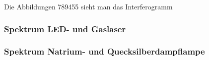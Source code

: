 {			\begin{figure}[htb]
				\centering
				
				\caption{}
				\label{fig:schwebung-1}
			\end{figure}

			\begin{figure}[htb]
				\centering
				
				\caption{}
				\label{fig:schwebung-2}
			\end{figure}

			Die Abbildungen 789455 sieht man das Interferogramm 

		\subsubsection{Spektrum LED- und Gaslaser} %
		\label{ssub:spektrum_led_und_gaslaser}
		
			\begin{figure}[htb]
				\centering
				
				\caption{}
				\label{fig:}
			\end{figure}

			\begin{figure}[htb]
				\centering
				
				\caption{}
				\label{fig:}
			\end{figure}

			\begin{figure}[htb]
				\centering
				
				\caption{}
				\label{fig:}
			\end{figure}


		\subsubsection{Spektrum Natrium- und Quecksilberdampflampe} %
		\label{ssub:spektrum_natrium_und_quecksilberdampflampe}

			\begin{figure}[htb]
				\centering
				
				\caption{}
				\label{fig:}
			\end{figure}

			\begin{figure}[htb]
				\centering
				
				\caption{}
				\label{fig:}
			\end{figure}
			


}
